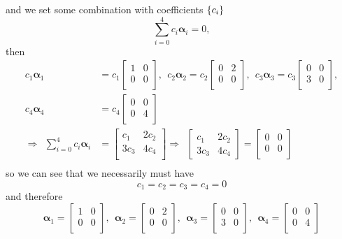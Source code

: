 and we set some combination with coefficients $\{c_{i}\}$
$$
\sum_{i=0}^{4}c_{i}\bm{\alpha}_{i} = 0,
$$
then
$$
\begin{aligned}
c_{1}\bm{\alpha}_{1} &= c_{1}\begin{bmatrix}
    1 & 0 \\
    0 & 0 \\
    \end{bmatrix}, \:\:
c_{2}\bm{\alpha}_{2} = c_{2}\begin{bmatrix}
    0 & 2 \\
    0 & 0 \\
    \end{bmatrix}, \:\:
c_{3}\bm{\alpha}_{3} = c_{3}\begin{bmatrix}
    0 & 0 \\
    3 & 0 \\
    \end{bmatrix}, \\
c_{4}\bm{\alpha}_{4} &= c_{4}\begin{bmatrix}
    0 & 0 \\
    0 & 4 \\
    \end{bmatrix} \\
\Rightarrow \:\: \sum_{i=0}^{4}c_{i}\bm{\alpha}_{i}&= \begin{bmatrix}
c_{1} & 2c_{2} \\
3c_{3} & 4c_{4} \\
\end{bmatrix} 
\Rightarrow \:\: \begin{bmatrix}
c_{1} & 2c_{2} \\
3c_{3} & 4c_{4} 
\end{bmatrix} =
\begin{bmatrix}
0 & 0 \\
0 & 0 \\
\end{bmatrix}\\
\end{aligned} 
$$
so we can see that we necessarily must have
$$
c_{1}=c_{2}=c_{3}=c_{4}=0
$$
and therefore 
$$
\bm{\alpha}_{1} = \begin{bmatrix}
    1 & 0 \\
    0 & 0 \\
    \end{bmatrix}, \:\:
\bm{\alpha}_{2} = \begin{bmatrix}
    0 & 2 \\
    0 & 0 \\
    \end{bmatrix}, \:\:
\bm{\alpha}_{3} = \begin{bmatrix}
    0 & 0 \\
    3 & 0 \\
    \end{bmatrix}, \:\:
\bm{\alpha}_{4} = \begin{bmatrix}
    0 & 0 \\
    0 & 4 \\
    \end{bmatrix}
$$
